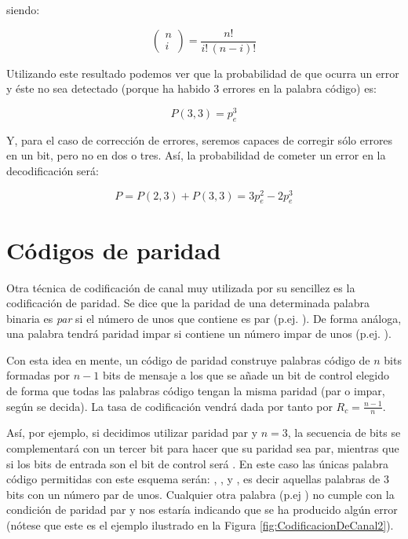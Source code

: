 \documentclass[es,apuntes]{uah}
\begin{document}
 siendo:
 
 \begin{displaymath}
 	\left ( \begin{array}{c}n \\i \end{array} \right ) = \frac{n!}{i! \, (n-i)!}
 \end{displaymath}
 
 Utilizando este resultado podemos ver que la probabilidad de que ocurra un error y éste no sea detectado (porque ha habido $3$ errores en la palabra código) es:
 
 \begin{displaymath}
 	P(3,3) = p_e^3
 \end{displaymath}

Y, para el caso de corrección de errores, seremos capaces de corregir sólo errores en un bit, pero no en dos o tres. Así, la probabilidad de cometer un error en la decodificación será:

\begin{displaymath}
	P = P(2,3) + P(3,3) = 3 p_e^2 - 2 p_e^3
\end{displaymath}






\section{Códigos de paridad}
 
 Otra técnica de codificación de canal muy utilizada por su sencillez es la codificación de paridad. Se dice que la paridad de una determinada palabra binaria es \emph{par} si el número de unos que contiene es par (p.ej. ). De forma análoga, una palabra tendrá paridad impar si contiene un número impar de unos (p.ej. ). 
 
 Con esta idea en mente, un código de paridad construye palabras código de $n$ bits formadas por $n-1$ bits de mensaje a los que se añade un bit de control elegido de forma que todas las palabras código tengan la misma paridad (par o impar, según se decida). La tasa de codificación vendrá dada por tanto por $R_c = \frac{n-1}{n}$.
 
 Así, por ejemplo, si decidimos utilizar paridad par y $n=3$, la secuencia de bits  se complementará con un tercer bit  para hacer que su paridad sea par, mientras que si los bits de entrada son  el bit de control será . En este caso las únicas palabra código permitidas con este esquema serán: , ,  y , es decir aquellas palabras de $3$ bits con un número par de unos. Cualquier otra palabra (p.ej ) no cumple con la condición de paridad par y nos estaría indicando que se ha producido algún error (nótese que este es el ejemplo ilustrado en la Figura \ref{fig:CodificacionDeCanal2}). 
\end{document}
